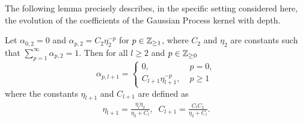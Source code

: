 The following lemma precisely describes, in the specific setting considered here, the evolution of the coefficients of the Gaussian Process kernel with depth. 

\begin{lemma} \label{lemma:deep_alpha_coeffs}
    Let $\alpha_{0,2} = 0$ and $\alpha_{p,2} = C_2 \eta_2^{-p}$ for $p \in \mathbb{Z}_{\geq 1}$, where $C_2$ and $\eta_2$ are constants such that $\sum_{p=1}^{\infty} \alpha_{p,2} = 1$. Then for all $l\geq 2$ and $p \in \mathbb{Z}_{\geq 0}$  \begin{equation}\label{eq:deep_exp_induction_hypothesis}
    \alpha_{p,l+1} = 
         \begin{cases}
            0, & \; p=0,\\
            C_{l+1} \eta_{l+1}^{-p}, & \;p \geq 1
        \end{cases}
    \end{equation}
    where the constants $\eta_{l+1}$ and $C_{l+1}$ are defined as
    \begin{equation}
    \begin{aligned} \label{eq:recurrence_C_eta}
        \eta_{l+1} = \frac{\eta_l \eta_2}{\eta_2 + C_l}, \;\; 
        C_{l+1} = \frac{C_l C_2}{\eta_2 + C_l}.
    \end{aligned}
    \end{equation}
\end{lemma}

